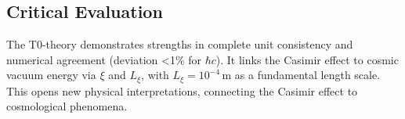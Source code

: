 \documentclass{article}
\begin{document}
	\subsection{Critical Evaluation}
	The T0-theory demonstrates strengths in complete unit consistency and numerical agreement (deviation <1\% for $\hbar c$). It links the Casimir effect to cosmic vacuum energy via $\xi$ and $L_\xi$, with $L_\xi = 10^{-4} \, \text{m}$ as a fundamental length scale. This opens new physical interpretations, connecting the Casimir effect to cosmological phenomena.
	
\end{document}
